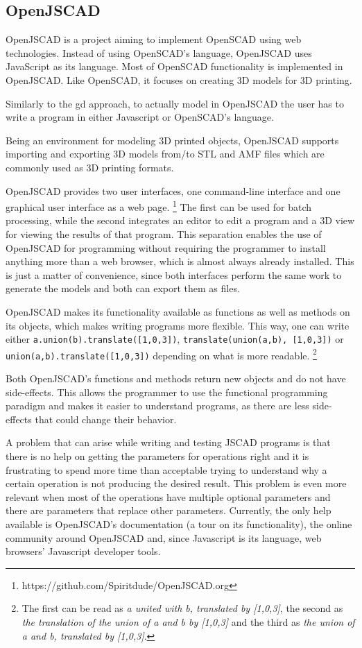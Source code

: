 \subsection{OpenJSCAD}
OpenJSCAD\cite{openjscad2015site} is a project aiming to implement OpenSCAD\cite{kintel2011openscad} using web technologies.
Instead of using OpenSCAD's language, OpenJSCAD uses JavaScript as its language.
Most of OpenSCAD functionality is implemented in OpenJSCAD.
Like OpenSCAD, it focuses on creating 3D models for 3D printing.

Similarly to the \gls{gd} approach, to actually model in OpenJSCAD the user has to write a program in either Javascript or OpenSCAD's language.

Being an environment for modeling 3D printed objects, OpenJSCAD supports importing and exporting 3D models from/to STL and AMF files which are commonly used as 3D printing formats.

OpenJSCAD provides two user interfaces, one command-line interface and one graphical user interface as a web page.%
\footnote{https://github.com/Spiritdude/OpenJSCAD.org}
The first can be used for batch processing, while the second integrates an editor to edit a program and a 3D view for viewing the results of that program.
This separation enables the use of OpenJSCAD for programming without requiring the programmer to install anything more than a web browser, which is almost always already installed.
This is just a matter of convenience, since both interfaces perform the same work to generate the models and both can export them as files.

OpenJSCAD makes its functionality available as functions as well as methods on its objects, which makes writing programs more flexible.
This way, one can write either \texttt{a.union(b).translate([1,0,3])}, \texttt{translate(union(a,b), [1,0,3])} or \texttt{union(a,b).translate([1,0,3])} depending on what is more readable.%
\footnote{The first can be read as \emph{a united with b, translated by [1,0,3]}, the second as \emph{the translation of the union of a and b by [1,0,3]} and the third as \emph{the union of a and b, translated by [1,0,3]}.}

Both OpenJSCAD's functions and methods return new objects and do not have side-effects.
This allows the programmer to use the functional programming paradigm and makes it easier to understand programs, as there are less side-effects that could change their behavior.

A problem that can arise while writing and testing JSCAD programs is that there is no help on getting the parameters for operations right and it is frustrating to spend more time than acceptable trying to understand why a certain operation is not producing the desired result.
This problem is even more relevant when most of the operations have multiple optional parameters and there are parameters that replace other parameters.
Currently, the only help available is OpenJSCAD's documentation (a tour on its functionality), the online community around OpenJSCAD and, since Javascript is its language, web browsers' Javascript developer tools.


